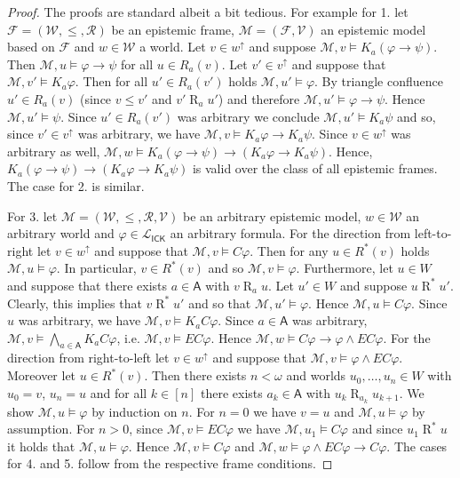 \documentclass{myifcolog}
\newcommand\C {C}
\newcommand{\K}{K}
\newcommand\A{\mathsf{A}}
\newcommand{\agi}{a}
\newcommand{\E}{E}
\newcommand{\ICK}{\mathsf{ICK}}
\newcommand{\LICK}{\mathcal{L}_{\ICK}}
\newcommand{\fw}{\mathcal{M}}
\newcommand{\Rel}{\mathrel{R}}
\newcommand{\W}{\mathcal{W}}
\newcommand{\rel}{\mathcal{R}}
\newcommand{\Fr}{\mathcal{F}}
\newcommand{\V}{\mathcal{V}}
\numberwithin{theorem}{section}
\begin{document}
\begin{proof}
    The proofs are standard albeit a bit tedious. For example for 1. let $\Fr=(\W, \leq, \rel)$ be an epistemic frame, $\fw =(\Fr, \V)$ an epistemic model based on $\Fr$ and $w \in \W$ a world. Let $v \in w^\uparrow$ and suppose $\fw, v \models \K_\agi(\varphi \rightarrow \psi)$. Then $\fw, u \models \varphi \rightarrow \psi$ for all $u \in R_\agi(v)$. Let $v' \in v^\uparrow$ and suppose that $\fw, v' \models \K_\agi \varphi$. Then for all $u' \in R_\agi(v')$ holds $\fw, u' \models \varphi$. By triangle confluence $u' \in R_\agi(v)$ (since $v \leq v'$ and $v' \Rel_\agi u'$) and therefore $\fw,u' \models \varphi \rightarrow \psi$. Hence $\fw, u' \models \psi$. Since $u' \in R_\agi(v')$ was arbitrary we conclude $\fw, u' \models \K_\agi \psi$ and so, since $v' \in v^\uparrow$ was arbitrary, we have $\fw, v \models \K_\agi \varphi \rightarrow \K_\agi \psi$. Since $v \in w^\uparrow$ was arbitrary as well, $\fw, w \models \K_\agi (\varphi \rightarrow \psi) \rightarrow (\K_\agi \varphi \rightarrow \K_\agi \psi)$. Hence, $\K_\agi (\varphi \rightarrow \psi) \rightarrow (\K_\agi \varphi \rightarrow \K_\agi \psi)$ is valid over the class of all epistemic frames. The case for 2. is similar. \smallskip
    
    \noindent For 3. let $\fw=(\W, \leq, \rel, \V)$ be an arbitrary epistemic model, $w \in \W$ an arbitrary world and $\varphi \in \LICK$ an arbitrary formula. For the direction from left-to-right let $v \in w^\uparrow$ and suppose that $\fw, v \models \C \varphi$. Then for any $u \in R^*(v)$ holds $\fw, u \models \varphi$. In particular, $v \in R^*(v)$ and so $\fw, v \models \varphi$. Furthermore, let $u \in W$ and suppose that there exists $\agi \in \A$ with $v \Rel_\agi u$. Let $u' \in W$ and suppose $u \Rel^* u'$. Clearly, this implies that $v \Rel^* u'$ and so that $\fw, u' \models \varphi$. Hence $\fw, u \models \C \varphi$. Since $u$ was arbitrary, we have $\fw, v \models \K_\agi \C \varphi$. Since $\agi \in \A$ was arbitrary, $\fw, v \models \bigwedge_{\agi \in \A} \K_\agi \C \varphi$, i.e. $\fw, v \models \E \C \varphi$. Hence $\fw, w \models \C \varphi \rightarrow \varphi \wedge \E \C \varphi$. For the direction from right-to-left let $v \in w^\uparrow$ and suppose that $\fw, v \models \varphi \wedge \E \C \varphi$. Moreover let $u \in R^*(v)$. Then there exists $n < \omega$ and worlds $u_0, \ldots, u_n \in W$ with $u_0 = v$, $u_n = u$ and for all $k \in [n]$ there exists $\agi_k \in \A$ with $u_k \Rel_{\agi_k} u_{k+1}$. We show $\fw, u \models \varphi$ by induction on $n$. For $n=0$ we have $v= u$ and $\fw, u \models \varphi$ by assumption. For $n>0$, since $\fw, v \models \E \C \varphi$ we have $\fw, u_1 \models \C \varphi$ and since $u_1 \Rel^* u$ it holds that $\fw, u \models \varphi$. Hence $\fw, v \models \C \varphi$ and $\fw, w \models \varphi \wedge \E \C \varphi \rightarrow \C \varphi$. The cases for 4. and 5. follow from the respective frame conditions.
\end{proof}
\end{document}
